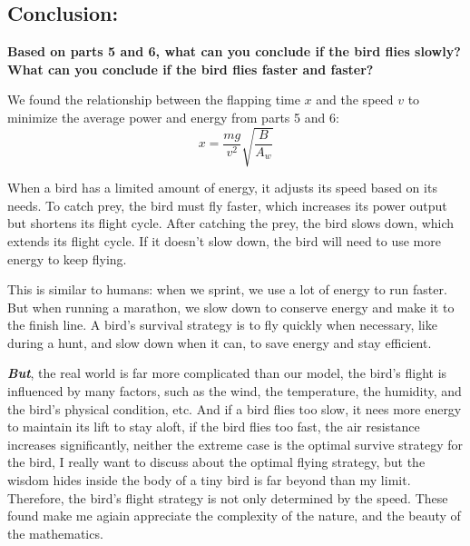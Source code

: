 \documentclass{article}
\begin{document}
\subsection*{Conclusion:}
{\large \bfseries Based on parts 5 and 6, what can you conclude if the bird flies slowly? What can you conclude if the bird flies faster and faster?}

We found the relationship between the flapping time \(x\) and the speed \(v\) to minimize the average power and energy from parts 5 and 6:
\[x = \frac{mg}{v^2}\sqrt{\frac{B}{A_w}}\]

When a bird has a limited amount of energy, it adjusts its speed based on its needs. To catch prey, the bird must fly faster, which increases its power output but shortens its flight cycle. After catching the prey, the bird slows down, which extends its flight cycle. If it doesn’t slow down, the bird will need to use more energy to keep flying.

This is similar to humans: when we sprint, we use a lot of energy to run faster. But when running a marathon, we slow down to conserve energy and make it to the finish line. A bird’s survival strategy is to fly quickly when necessary, like during a hunt, and slow down when it can, to save energy and stay efficient.

\textbf{\textit{But}}, the real world is far more complicated than our model, the bird's flight is influenced by many factors, such as the wind, the temperature, the humidity, and the bird's physical condition, etc. And if a bird flies too slow, it nees more energy to maintain its lift to stay aloft, if the bird flies too fast, the air resistance increases significantly, neither the extreme case is the optimal survive strategy for the bird, I really want to discuss about the optimal flying strategy, but the wisdom hides inside the body of a tiny bird is far beyond than my limit. Therefore, the bird's flight strategy is not only determined by the speed. These found make me agiain appreciate the complexity of the nature, and the beauty of the mathematics.
\end{document}
